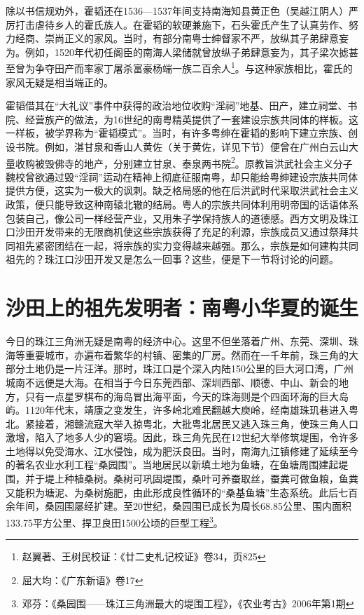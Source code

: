 除以书信规劝外，霍韬还在1536—1537年间支持南海知县黄正色（吴越江阴人）严厉打击虐待乡人的霍氏族人。在霍韬的软硬兼施下，石头霍氏产生了认真劳作、努力经商、崇尚正义的家风。当时，有部分南粤士绅督家不严，放纵其子弟肆意妄为。例如，1520年代初任阁臣的南海人梁储就曾放纵子弟肆意妄为，其子梁次摅甚至曾为争夺田产而率家丁屠杀富豪杨端一族二百余人\footnote{赵翼著、王树民校证：《廿二史札记校证》卷34，页825}。与这种家族相比，霍氏的家风无疑是相当端正的。

霍韬借其在“大礼议”事件中获得的政治地位收购“淫祠”地基、田产，建立祠堂、书院、经营族产的做法，为16世纪的南粤精英提供了一套建设宗族共同体的样板。这一样板，被学界称为“霍韬模式”。当时，有许多粤绅在霍韬的影响下建立宗族、创设书院。例如，湛甘泉和香山人黄佐（关于黄佐，详见下节）便曾在广州白云山大量收购被毁佛寺的地产，分别建立甘泉、泰泉两书院\footnote{屈大均：《广东新语》卷17}。原教旨洪武社会主义分子魏校曾欲通过毁“淫祠”运动在精神上彻底征服南粤，却只能给粤绅建设宗族共同体提供方便，这实为一极大的讽刺。缺乏格局感的他在后洪武时代采取洪武社会主义政策，便只能导致这种南辕北辙的结局。粤人的宗族共同体利用明帝国的话语体系包装自己，像公司一样经营产业，又用朱子学保持族人的道德感。西方文明及珠江口沙田开发带来的无限商机使这些宗族获得了充足的利源，宗族成员又通过祭拜共同祖先紧密团结在一起，将宗族的实力变得越来越强。那么，宗族是如何建构共同祖先的？珠江口沙田开发又是怎么一回事？这些，便是下一节将讨论的问题。

\section{沙田上的祖先发明者：南粤小华夏的诞生}

今日的珠江三角洲无疑是南粤的经济中心。这里不但坐落着广州、东莞、深圳、珠海等重要城市，亦遍布着繁华的村镇、密集的厂房。然而在一千年前，珠三角的大部分土地仍是一片汪洋。那时，珠江口是个深入内陆150公里的巨大河口湾，广州城南不远便是大海。在相当于今日东莞西部、深圳西部、顺德、中山、新会的地方，只有一点星罗棋布的海岛冒出海平面，今天的珠海则是个四面环海的巨大岛屿。1120年代末，靖康之变发生，许多岭北难民翻越大庾岭，经南雄珠玑巷进入粤北。紧接着，湘赣流寇大举入掠粤北，大批粤北居民又逃入珠三角，使珠三角人口激增，陷入了地多人少的窘境。因此，珠三角先民在12世纪大举修筑堤围，令许多土地得以免受海水、江水侵蚀，成为肥沃良田。当时，南海九江镇修建了延续至今的著名农业水利工程“桑园围”。当地居民以新填土地为鱼塘，在鱼塘周围建起堤围，并于堤上种植桑树。桑树可巩固堤围，桑叶可养蚕取丝，蚕粪可做鱼粮，鱼粪又能积为塘泥、为桑树施肥，由此形成良性循环的“桑基鱼塘”生态系统。此后七百余年间，桑园围屡经扩建。至20世纪，桑园围已成长为周长68.85公里、围内面积133.75平方公里、捍卫良田1500公顷的巨型工程\footnote{邓芬：《桑园围——珠江三角洲最大的堤围工程》，《农业考古》2006年第1期}。

